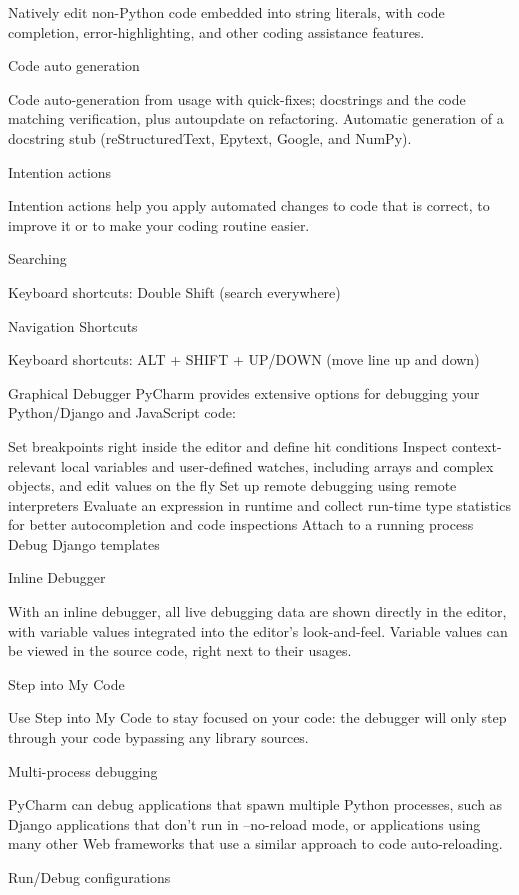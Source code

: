 Natively edit non-Python code embedded into string literals, with code completion, error-highlighting, and other coding assistance features.

Code auto generation

Code auto-generation from usage with quick-fixes; docstrings and the code matching verification, plus autoupdate on refactoring. Automatic generation of a docstring stub (reStructuredText, Epytext, Google, and NumPy).

Intention actions

Intention actions help you apply automated changes to code that is correct, to improve it or to make your coding routine easier.

Searching

Keyboard shortcuts: Double Shift (search everywhere)

Navigation
Shortcuts

Keyboard shortcuts: ALT + SHIFT + UP/DOWN (move line up and down)

Graphical Debugger
PyCharm provides extensive options for debugging your Python/Django and JavaScript code:

Set breakpoints right inside the editor and define hit conditions
Inspect context-relevant local variables and user-defined watches, including arrays and complex objects, and edit values on the fly
Set up remote debugging using remote interpreters
Evaluate an expression in runtime and collect run-time type statistics for better autocompletion and code inspections
Attach to a running process
Debug Django templates


Inline Debugger

With an inline debugger, all live debugging data are shown directly in the editor, with variable values integrated into the editor's look-and-feel. Variable values can be viewed in the source code, right next to their usages.

Step into My Code

Use Step into My Code to stay focused on your code: the debugger will only step through your code bypassing any library sources.

Multi-process debugging

PyCharm can debug applications that spawn multiple Python processes, such as Django applications that don't run in --no-reload mode, or applications using many other Web frameworks that use a similar approach to code auto-reloading.

Run/Debug configurations

